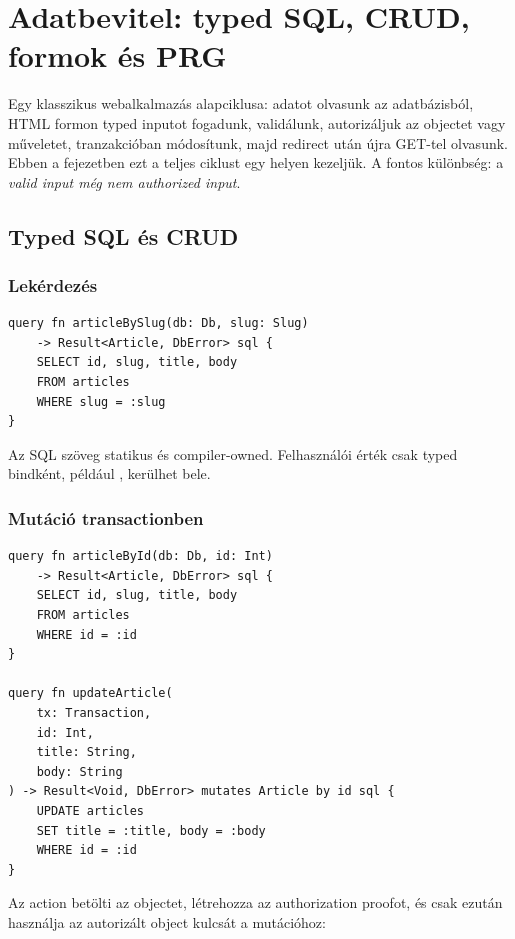 \chapter{Adatbevitel: typed SQL, CRUD, formok és PRG}

Egy klasszikus webalkalmazás alapciklusa: adatot olvasunk az adatbázisból, HTML formon typed inputot fogadunk, validálunk, autorizáljuk az objectet vagy műveletet, tranzakcióban módosítunk, majd redirect után újra GET-tel olvasunk. Ebben a fejezetben ezt a teljes ciklust egy helyen kezeljük. A fontos különbség: a \emph{valid input még nem authorized input}.

\section{Typed SQL és CRUD}

\subsection*{Lekérdezés}

\begin{lstlisting}[language=RWLang]
query fn articleBySlug(db: Db, slug: Slug)
    -> Result<Article, DbError> sql {
    SELECT id, slug, title, body
    FROM articles
    WHERE slug = :slug
}
\end{lstlisting}

Az SQL szöveg statikus és compiler-owned. Felhasználói érték csak typed bindként, például , kerülhet bele.

\subsection*{Mutáció transactionben}

\begin{lstlisting}[language=RWLang]
query fn articleById(db: Db, id: Int)
    -> Result<Article, DbError> sql {
    SELECT id, slug, title, body
    FROM articles
    WHERE id = :id
}

query fn updateArticle(
    tx: Transaction,
    id: Int,
    title: String,
    body: String
) -> Result<Void, DbError> mutates Article by id sql {
    UPDATE articles
    SET title = :title, body = :body
    WHERE id = :id
}
\end{lstlisting}

Az action betölti az objectet, létrehozza az authorization proofot, és csak ezután használja az autorizált object kulcsát a mutációhoz:

